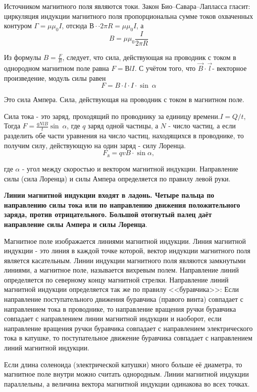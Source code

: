 \documentclass[a6paper, 11pt]{diss_4}
\renewcommand{\'}{\,'}
\begin{document}
Источником магнитного поля являются токи. Закон Био--Савара--Лапласса гласит: циркуляция индукции магнитного поля пропорциональна сумме токов охваченных контуром $\Gamma=\mu\mu_0I$, отсюда $В·\cdot2\pi R=\mu\mu_0I$, а
\[
B=\mu\mu_0\frac{I}{2\pi R}
\]

Из формулы $B=\frac{F}{Il}$, следует, что сила, действующая на проводник с током в однородном магнитном поле равна $F=ВlI$. С учётом  того, что $\vec{B}\cdot\vec{l}$- векторное произведение,  модуль силы равен
\[
F=B\cdot l\cdot I\cdot\sin\ \alpha
\]

Это сила Ампера. Сила, действующая на проводник с током в магнитном поле.

Сила тока - это заряд, проходящий по проводнику за единицу времени.$I=Q/t$,
Тогда $F=\frac{qNlB}{t}\sin\ \alpha$, где $q$ заряд одной частицы, а $N$ - число частиц, а если разделить обе части уравнения  на число частиц, находящихся в проводнике, то получим силу, действующую на один заряд - силу Лоренца.
\[
F_л=qvB\cdot\sin \alpha,
\]

где $\alpha$ - угол между скоростью и вектором магнитной индукции. Направление силы (сила Лоренца) и силы Ампера определяется по правилу левой руки.

\textbf{Линии магнитной индукции входят в ладонь. Четыре пальца по направлению силы тока или по направлению движения положительного заряда, против отрицательного. Большой отогнутый палец даёт направление силы Ампера и силы Лоренца}.

Магнитное поле изображается линиями магнитной индукции. Линия  магнитной индукции - это линия в каждой точке которой, вектор индукции магнитного поля является касательным.  Линии индукции магнитного поля являются замкнутыми линиями, а магнитное поле, называется вихревым полем. Направление линий определяется по северному концу магнитной стрелки.
Направление линий магнитной индукции определяется так же по правилу <<буравчика>>: Если направление поступательного движения буравчика (правого винта) совпадает с направлением тока в проводнике, то направление вращения ручки буравчика совпадает с направлением линии магнитной индукции и наоборот, если направление вращения ручки буравчика совпадает с направлением электрического тока в катушке, то поступательное движение буравчика совпадает с направлением линий магнитной индукции.

Если длина соленоида (электрической катушки) много больше её диаметра, то магнитное поле внутри можно считать однородным. Линии магнитной индукции параллельны, а величина вектора магнитной индукции одинакова во всех точках.
\end{document}
